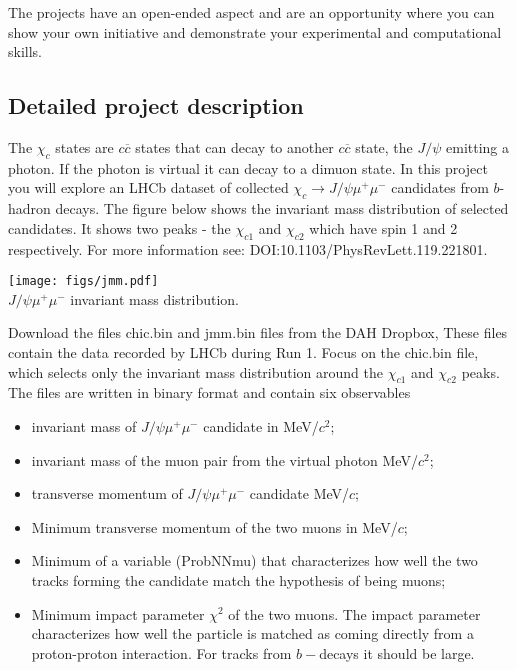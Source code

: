 The projects have an open-ended aspect and are an opportunity where you can show your own initiative and demonstrate your experimental and computational skills.




\subsection{Detailed project description}

The $\chi_c$ states are $c\overline{c}$ states that can decay to another $c\overline{c}$ state, the  $J/\psi$ emitting a photon. If the photon is virtual it can decay to a dimuon state. 
In this project you will explore an LHCb dataset of collected $\chi_c \rightarrow J/\psi \mu^+ \mu^-$ candidates from $b$-hadron decays. The figure below shows the invariant mass distribution of selected candidates. It shows two peaks - the $\chi_{c1}$ and $\chi_{c2}$ which have spin 1 and 2 respectively.
For more information see: {DOI:10.1103/PhysRevLett.119.221801}. 
%
\begin{center}
\texttt{[image: figs/jmm.pdf]}\\
{\small $J/\psi \mu^+ \mu^-$ invariant mass distribution.}
\end{center}
%

Download the files chic.bin and jmm.bin files  from the DAH Dropbox, 
These files contain the data recorded by LHCb during Run 1. Focus on the chic.bin file, which selects only the invariant mass distribution around the $\chi_{c1}$ and $\chi_{c2}$ peaks. 
The files are written in binary format and contain six observables
\begin{itemize}
\item  invariant mass of $J/\psi \mu^+ \mu^-$  candidate  in  MeV/$c^2$;
\item  invariant mass of the muon pair from the virtual photon   MeV/$c^2$;
\item transverse momentum of  $J/\psi \mu^+ \mu^-$   candidate  MeV/$c$;
\item Minimum transverse momentum of the two muons in MeV/$c$;
\item Minimum of a variable (ProbNNmu) that characterizes how well the two tracks forming the candidate match the hypothesis of being muons;
\item Minimum impact parameter $\chi^2$ of the two muons. The impact parameter characterizes how well the particle is matched as coming directly from a proton-proton interaction. For tracks from
 $b-$decays it should be large.
\end{itemize}

